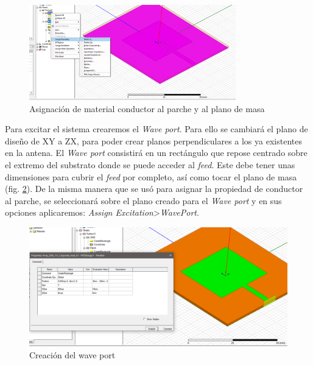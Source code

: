 \\
\begin{figure}[h]
    \centering
        \includegraphics[width=0.8\textwidth]{archivos/desarrollo/5}
        \caption{Asignación de material conductor al parche y al plano de masa}
        \label{fig:perfecte}
\end{figure}
\par Para excitar el sistema crearemos el \textit{Wave port}. Para ello se cambiará el plano de diseño de XY a ZX, para poder crear planos perpendiculares a los ya existentes en la antena. El \textit{Wave port} consistirá en un rectángulo que repose centrado sobre el extremo del substrato donde se puede acceder al \textit{feed}. Este debe tener unas dimensiones para cubrir el \textit{feed} por completo, así como tocar el plano de masa (fig. \ref{fig:waveport}). De la misma manera que se usó para asignar la propiedad de conductor al parche, se seleccionará sobre el plano creado para el \textit{Wave port} y en sus opciones aplicaremos: \textit{Assign Excitation}>\textit{WavePort}. 
\\

\begin{figure}[p]
    \centering
        \includegraphics[width=\textwidth]{archivos/desarrollo/6}
        \caption{Creación del wave port}
        \label{fig:waveport}
\end{figure}

